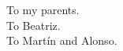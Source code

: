 
\begin{dedication} %

\hfill To my parents. \\
\hfill To Beatriz. \\
\hfill To Martín and Alonso.

\end{dedication}


